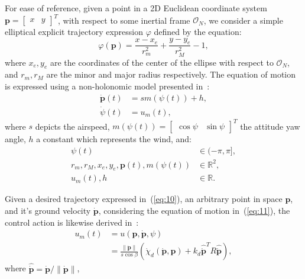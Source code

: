 \documentclass[letterpaper,10pt,conference]{ieeeconf}
\begin{document}
For ease of reference, given a point in a 2D Euclidean coordinate system $\mathbf{p}=\begin{bmatrix}x&y\end{bmatrix}^T$, with respect to some inertial frame $\mathcal{O}_N$, we consider a simple elliptical explicit trajectory expression $\varphi$ defined by the equation:
\begin{equation}\label{eq:10}
  \varphi(\mathbf{p})=\frac{x-x_e}{r_m^2}+\frac{y-y_e}{r_M^2}-1,
\end{equation}
where $x_e, y_e$ are the coordinates of the center of the ellipse with respect to $\mathcal{O}_N$, and $r_m, r_M$ are the minor and major radius respectively. The equation of motion is expressed using a non-holonomic model presented in~\cite{de2017guidance}:
\begin{equation}\label{eq:11}\begin{split}
  \dot{\mathbf{p}}(t)&=sm\left( \psi(t) \right)+h,\\
  \dot{\psi}(t)&=u_m(t),
\end{split}
\end{equation}
where $s$ depicts the airspeed, $m(\psi(t))=\begin{bmatrix}\cos{\psi}&\sin{\psi}\end{bmatrix}^T$ the attitude yaw angle, $h$ a constant which represents the wind, and:
\begin{equation}\begin{split}
  \psi(t)&\in(-\pi,\pi],\\
  r_m,r_M,x_e,y_e,\mathbf{p}(t),m(\psi(t))&\in\mathbb{R}^2,\\
  u_m(t),h&\in\mathbb{R}.
\end{split}
\end{equation}

Given a desired trajectory expressed in~(\ref{eq:10}), an arbitrary point in space $\mathbf{p}$, and it's ground velocity $\dot{\mathbf{p}}$, considering the equation of motion in~(\ref{eq:11}), the control action is likewise derived in~\cite{de2017guidance}:
\begin{equation}\begin{split}
  u_m(t)&=u(\mathbf{p},\dot{\mathbf{p}},\psi)\\
        &=\frac{\lVert \dot{\mathbf{p}}\rVert}{s\cos{\beta}}\left(\dot{\chi}_d(\dot{\mathbf{p}},\mathbf{p})+k_d\hat{\dot{\mathbf{p}}}^TR\hat{\dot{\mathbf{p}}}\right),
\end{split}
\end{equation}
where $\hat{\dot{\mathbf{p}}}=\dot{\mathbf{p}}/\lVert\dot{\mathbf{p}}\rVert$,  
\end{document}
